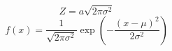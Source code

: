 \begin{equation}
Z = a\sqrt{2\pi\sigma^2} \label{eq:I_Gaus}
\end{equation}
\begin{equation}
	f (x) = \frac{1}{\sqrt{2 \pi \sigma^2}} \exp{\left( - \frac{(x-\mu)^2}{2 \sigma^2} \right)}
\end{equation}
